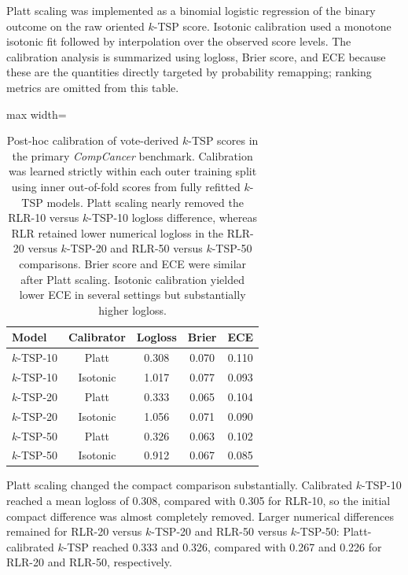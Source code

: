 \documentclass[11pt, a4paper]{article}
\newcommand{\stdtablefont}{\small}
\newcommand{\stdtablelayout}{%
  \stdtablefont
  \setlength{\tabcolsep}{4pt}
  \renewcommand{\arraystretch}{1.2}
}
\begin{document}
Platt scaling was implemented as a binomial logistic regression of the binary outcome on the raw oriented $k$-TSP score. Isotonic calibration used a monotone isotonic fit followed by interpolation over the observed score levels. The calibration analysis is summarized using logloss, Brier score, and ECE because these are the quantities directly targeted by probability remapping; ranking metrics are omitted from this table.

\begin{table}[!htbp]
\centering
\caption{Post-hoc calibration of vote-derived $k$-TSP scores in the primary \emph{CompCancer} benchmark. Calibration was learned strictly within each outer training split using inner out-of-fold scores from fully refitted $k$-TSP models. Platt scaling nearly removed the RLR-10 versus $k$-TSP-10 logloss difference, whereas RLR retained lower numerical logloss in the RLR-20 versus $k$-TSP-20 and RLR-50 versus $k$-TSP-50 comparisons. Brier score and ECE were similar after Platt scaling. Isotonic calibration yielded lower ECE in several settings but substantially higher logloss.}
\label{tab:calibrated_ktsp_world}
{\stdtablelayout
\begin{adjustbox}{max width=\linewidth}
\begin{tabular}{lcccc}
\toprule
\textbf{Model} &
\textbf{Calibrator} &
\textbf{Logloss} &
\textbf{Brier} &
\textbf{ECE} \\
\midrule
$k$-TSP-10 & Platt    & 0.308 & 0.070 & 0.110 \\
$k$-TSP-10 & Isotonic & 1.017 & 0.077 & 0.093 \\
\midrule
$k$-TSP-20 & Platt    & 0.333 & 0.065 & 0.104 \\
$k$-TSP-20 & Isotonic & 1.056 & 0.071 & 0.090 \\
\midrule
$k$-TSP-50 & Platt    & 0.326 & 0.063 & 0.102 \\
$k$-TSP-50 & Isotonic & 0.912 & 0.067 & 0.085 \\
\bottomrule
\end{tabular}
\end{adjustbox}
}
\end{table}

Platt scaling changed the compact comparison substantially. Calibrated $k$-TSP-10 reached a mean logloss of 0.308, compared with 0.305 for RLR-10, so the initial compact difference was almost completely removed. Larger numerical differences remained for RLR-20 versus $k$-TSP-20 and RLR-50 versus $k$-TSP-50: Platt-calibrated $k$-TSP reached 0.333 and 0.326, compared with 0.267 and 0.226 for RLR-20 and RLR-50, respectively.
\end{document}
